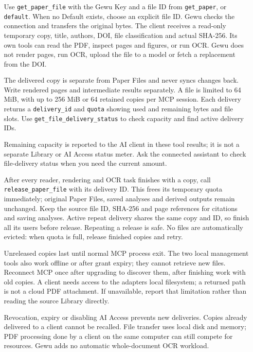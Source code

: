 \documentclass[10pt,letterpaper,oneside]{scrreprt}
\begin{document}
Use \texttt{get\_paper\_file} with the Gewu Key and a file ID from \texttt{get\_paper}, or \texttt{default}. When no Default exists, choose an explicit file ID. Gewu checks the connection and transfers the original bytes. The client receives a read-only temporary copy, title, authors, DOI, file classification and actual SHA-256. Its own tools can read the PDF, inspect pages and figures, or run OCR. Gewu does not render pages, run OCR, upload the file to a model or fetch a replacement from the DOI.

The delivered copy is separate from Paper Files and never syncs changes back. Write rendered pages and intermediate results separately. A file is limited to 64 MiB, with up to 256 MiB or 64 retained copies per MCP session. Each delivery returns a \texttt{delivery\_id} and \texttt{quota} showing used and remaining bytes and file slots. Use \texttt{get\_file\_delivery\_status} to check capacity and find active delivery IDs.

Remaining capacity is reported to the AI client in these tool results; it is not a separate Library or AI Access status meter. Ask the connected assistant to check file-delivery status when you need the current amount.

After every reader, rendering and OCR task finishes with a copy, call \texttt{release\_paper\_file} with its delivery ID. This frees its temporary quota immediately; original Paper Files, saved analyses and derived outputs remain unchanged. Keep the source file ID, SHA-256 and page references for citations and saving analyses. Active repeat delivery shares the same copy and ID, so finish all its users before release. Repeating a release is safe. No files are automatically evicted: when quota is full, release finished copies and retry.

Unreleased copies last until normal MCP process exit. The two local management tools also work offline or after grant expiry; they cannot retrieve new files. Reconnect MCP once after upgrading to discover them, after finishing work with old copies. A client needs access to the adapter\textquotesingle s local filesystem; a returned path is not a cloud PDF attachment. If unavailable, report that limitation rather than reading the source Library directly.

Revocation, expiry or disabling AI Access prevents new deliveries. Copies already delivered to a client cannot be recalled. File transfer uses local disk and memory; PDF processing done by a client on the same computer can still compete for resources. Gewu adds no automatic whole-document OCR workload.
\end{document}
